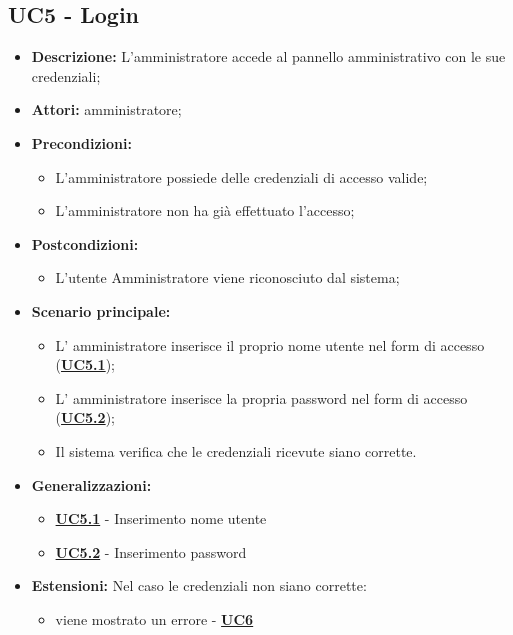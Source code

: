 \documentclass[5pt]{article}
\begin{document}
\subsection{UC5 - Login}
\label{sec:UC5}
\begin{itemize}
    \item \textbf{Descrizione:} L’amministratore accede al pannello amministrativo con le sue credenziali;
    \item \textbf{Attori:} amministratore;
    \item \textbf{Precondizioni:} 
    \begin{itemize}
        \item L’amministratore possiede delle credenziali di accesso valide;
        \item L’amministratore non ha già effettuato l’accesso;
    \end{itemize}
    \item \textbf{Postcondizioni:} 
    \begin{itemize}
        \item L’utente Amministratore viene riconosciuto dal sistema;
    \end{itemize}
    \item \textbf{Scenario principale:} 
    \begin{itemize}
        \item L’ amministratore inserisce il proprio nome utente nel form di accesso (\hyperref[sec:UC5.1]{\textbf{UC5.1}});
        \item L’ amministratore inserisce la propria password nel form di accesso (\hyperref[sec:UC5.2]{\textbf{UC5.2}});
        \item Il sistema verifica che le credenziali ricevute siano corrette. 
    \end{itemize}
    \item \textbf{Generalizzazioni:} 
    \begin{itemize}
        \item \hyperref[sec:UC5.1]{\textbf{UC5.1}} - Inserimento nome utente
        \item \hyperref[sec:UC5.2]{\textbf{UC5.2}} - Inserimento password
    \end{itemize}
    \item \textbf{Estensioni:} Nel caso le credenziali non siano corrette:
    \begin{itemize}
        \item viene mostrato un errore - \hyperref[sec:UC6]{\textbf{UC6}}
    \end{itemize}
\end{itemize}
\end{document}
